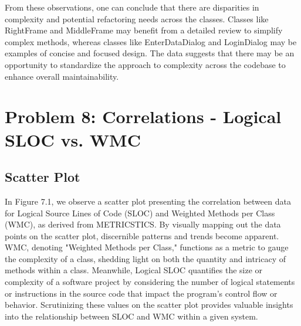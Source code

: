 \documentclass[english,12pt,a4paper]{report}
\begin{document}
	From these observations, one can conclude that there are disparities in complexity and potential refactoring needs across the classes. Classes like RightFrame and MiddleFrame may benefit from a detailed review to simplify complex methods, whereas classes like EnterDataDialog and LoginDialog may be examples of concise and focused design. The data suggests that there may be an opportunity to standardize the approach to complexity across the codebase to enhance overall maintainability.
	
	\chapter{Problem 8: Correlations - Logical SLOC vs. WMC}
	\section{Scatter Plot}
	In Figure 7.1, we observe a scatter plot presenting the correlation between data for Logical Source Lines of Code (SLOC) and Weighted Methods per Class (WMC), as derived from METRICSTICS. By visually mapping out the data points on the scatter plot, discernible patterns and trends become apparent. WMC, denoting "Weighted Methods per Class," functions as a metric to gauge the complexity of a class, shedding light on both the quantity and intricacy of methods within a class. Meanwhile, Logical SLOC quantifies the size or complexity of a software project by considering the number of logical statements or instructions in the source code that impact the program's control flow or behavior. Scrutinizing these values on the scatter plot provides valuable insights into the relationship between SLOC and WMC within a given system.
	
\end{document}
